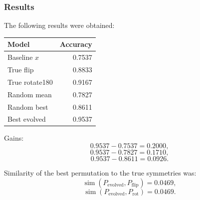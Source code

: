 \subsubsection{Results}

The following results were obtained:

\begin{center}
\begin{tabular}{lr}
\toprule
Model & Accuracy \\
\midrule
Baseline $x$ & 0.7537 \\
True flip & 0.8833 \\
True rotate180 & 0.9167 \\
Random mean & 0.7827 \\
Random best & 0.8611 \\
Best evolved & 0.9537 \\
\bottomrule
\end{tabular}
\end{center}

Gains:
\[
0.9537-0.7537=0.2000,
\]
\[
0.9537-0.7827=0.1710,
\]
\[
0.9537-0.8611=0.0926.
\]

Similarity of the best permutation to the true symmetries was:
\[
\operatorname{sim}(P_{\mathrm{evolved}},P_{\mathrm{flip}})=0.0469,
\]
\[
\operatorname{sim}(P_{\mathrm{evolved}},P_{\mathrm{rot}})=0.0469.
\]
